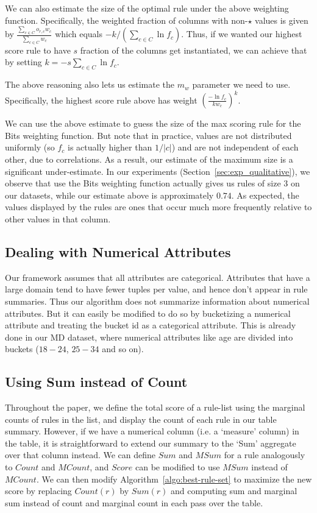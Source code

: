 \documentclass[10pt,journal,compsoc]{IEEEtran}
\begin{document}
{{We can also estimate the size of the optimal rule under the above weighting function. Specifically, the weighted fraction of columns with non-$\star$ values is given by $\frac{\sum_{c\in C} o_{r,c}w_c}{\sum_{c \in C} w_c}$ which equals $-k/(\sum_{c \in C} \ln f_c)$. Thus, if we wanted our highest score rule to have $s$ fraction of the columns get instantiated, we can achieve that by setting $k = -s\sum_{c \in C} \ln f_c$.

The above reasoning also lets us estimate the $m_w$ parameter we need to use. Specifically, the highest score rule above has weight $(\frac{-\ln f_c}{kw_c})^k$.

We can use the above estimate to guess the size of the max scoring rule for the Bits weighting function. But note that in practice, values are not distributed uniformly (so $f_c$ is actually higher than $1/|c|$) and are not independent of each other, due to correlations. As a result, our estimate of the maximum size is a significant under-estimate. In our experiments (Section~\ref{sec:exp_qualitative}), we observe that use the Bits weighting function actually gives us rules of size $3$ on our datasets, while our estimate above is approximately $0.74$. As expected, the values displayed by the rules are ones that occur much more frequently relative to other values in that column.
}

\subsection{Dealing with Numerical Attributes}\label{sec:extensions-numerical}
Our framework assumes that all attributes are categorical. Attributes that have a large domain tend to have fewer tuples per value, and hence don't appear in rule summaries. Thus our algorithm does not summarize information about numerical attributes. But it can easily be modified to do so by bucketizing a numerical attribute and treating the bucket id as a categorical attribute. This is already done in our MD dataset, where numerical attributes like age are divided into buckets ($18-24$, $25-34$ and so on).


\vspace{-5pt}
\subsection{Using Sum instead of Count}\label{sec:extensions-sum}
Throughout the paper, we define the total score of a rule-list using the marginal counts of rules in the list, and display the count of each rule in our table summary. However, if we have a numerical column (i.e. a `measure' column) in the table, it is straightforward to extend our summary to the `Sum' aggregate over that column instead. We can define $Sum$ and $MSum$ for a rule analogously to $Count$ and $MCount$, and $Score$ can be modified to use $MSum$ instead of $MCount$. We can then modify Algorithm~\ref{algo:best-rule-set} to maximize the new score by replacing $Count(r)$ by $Sum(r)$ and computing sum and marginal sum instead of count and marginal count in each pass over the table.}
\end{document}
